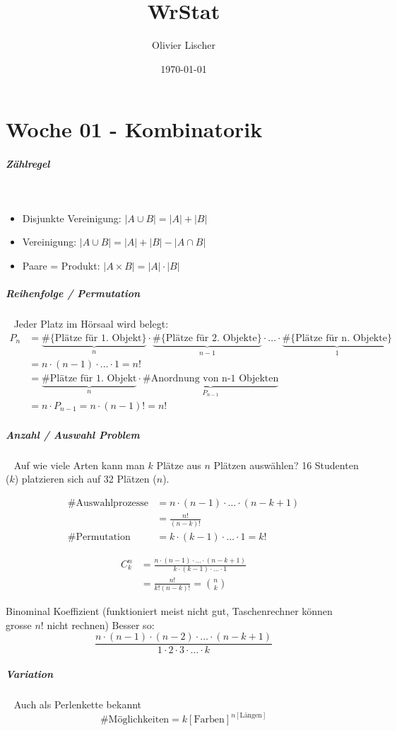 \documentclass[11pt,twoside,landscape]{article}
\author{Olivier Lischer}
\date{\today}
\title{WrStat}
\begin{document}
\pagestyle{fancy}
\fancyhf{}
\fancyfoot[CE,CO]{\leftmark}
\fancyfoot[R]{\thepage}
\section{Woche 01 - Kombinatorik}
\label{sec:orga29c132}
\subparagraph{Zählregel} \
\label{sec:org6f67fc7}
\begin{itemize}
\item Disjunkte Vereinigung: \(|A \cup B| = |A| + |B|\)
\item Vereinigung: \(|A \cup B| = |A| + |B| - |A \cap B|\)
\item Paare = Produkt: \(|A \times B| = |A| \cdot |B|\)
\end{itemize}
\subparagraph{Reihenfolge / Permutation} \
\label{sec:org509686c}
Jeder Platz im Hörsaal wird belegt:
\begin{align*}
  P_n &= \underbrace{\#\text{\{Plätze für 1. Objekt\}}}_{n} \cdot \underbrace{\#\text{\{Plätze für 2. Objekte\}}}_{n-1} \cdot \ldots \cdot \underbrace{\#\{\text{Plätze für n. Objekte\}}}_{1} \\
  &= n \cdot (n-1) \cdot \ldots \cdot 1 = n!  \\
  &= \underbrace{\#\text{Plätze für 1. Objekt}}_{n} \cdot \underbrace{\#\text{Anordnung von n-1 Objekten}}_{P_{n-1}} \\
  &= n \cdot P_{n-1} = n \cdot (n - 1)! = n!
\end{align*}
\subparagraph{Anzahl / Auswahl Problem} \
\label{sec:orgdc4b352}
Auf wie viele Arten kann man \(k\) Plätze aus \(n\) Plätzen auswählen?
16 Studenten (\(k\)) platzieren sich auf 32 Plätzen (\(n\)).

\begin{align*}
\text{\#Auswahlprozesse} &= n \cdot (n - 1) \cdot \ldots \cdot (n - k + 1) \\
&= \frac{n!}{(n-k)!} \\
\text{\#Permutation} &= k \cdot (k - 1) \cdot \ldots \cdot 1 = k!
\end{align*}

\begin{align*}
C_k^n &= \frac{n \cdot (n - 1) \cdot \ldots \cdot (n-k+1)}{k \cdot (k - 1) \cdot \ldots \cdot 1} \\
&= \frac{n!}{k! (n-k)!} = \binom{n}{k}
\end{align*}

Binominal Koeffizient (funktioniert meist nicht gut, Taschenrechner können grosse \(n!\) nicht rechnen)
Besser so:
\[
\frac{n \cdot (n - 1) \cdot (n - 2) \cdot \ldots \cdot (n-k + 1)}{1 \cdot 2 \cdot 3 \cdot \ldots \cdot k}
\]
\subparagraph{Variation} \
\label{sec:orgee4c033}
Auch als Perlenkette bekannt
\[
\text{\#Möglichkeiten} = k[\text{Farben}]^{n[\text{Längen}]}
\]
\end{document}

